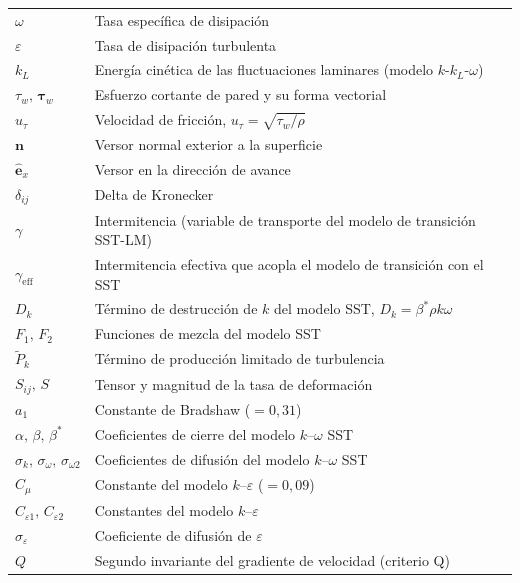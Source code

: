 \begin{longtable}{@{}p{} p{}@{}}
$\omega$    & Tasa específica de disipación \\
$\varepsilon$ & Tasa de disipación turbulenta \\
$k_L$       & Energía cinética de las fluctuaciones laminares (modelo $k$-$k_L$-$\omega$) \\
$\tau_w,\,\boldsymbol{\tau}_w$ & Esfuerzo cortante de pared y su forma vectorial \\
$u_\tau$    & Velocidad de fricción, $u_\tau=\sqrt{\tau_w/\rho}$ \\
$\mathbf{n}$ & Versor normal exterior a la superficie \\
$\hat{\mathbf{e}}_x$ & Versor en la dirección de avance \\
$\delta_{ij}$ & Delta de Kronecker \\
$\gamma$    & Intermitencia (variable de transporte del modelo de transición SST-LM) \\
$\gamma_{\mathrm{eff}}$ & Intermitencia efectiva que acopla el modelo de transición con el SST \\
$D_k$       & Término de destrucción de $k$ del modelo SST, $D_k=\beta^*\rho k\omega$ \\
$F_1,\,F_2$ & Funciones de mezcla del modelo SST \\
$\tilde{P}_k$ & Término de producción limitado de turbulencia \\
$S_{ij},\,S$& Tensor y magnitud de la tasa de deformación \\
$a_1$       & Constante de Bradshaw ($=0{,}31$) \\
$\alpha,\,\beta,\,\beta^*$ & Coeficientes de cierre del modelo $k$--$\omega$ SST \\
$\sigma_k,\,\sigma_\omega,\,\sigma_{\omega 2}$ & Coeficientes de difusión del modelo $k$--$\omega$ SST \\
$C_\mu$     & Constante del modelo $k$--$\varepsilon$ ($=0{,}09$) \\
$C_{\varepsilon 1},\,C_{\varepsilon 2}$ & Constantes del modelo $k$--$\varepsilon$ \\
$\sigma_\varepsilon$ & Coeficiente de difusión de $\varepsilon$ \\
$Q$         & Segundo invariante del gradiente de velocidad (criterio Q) \\
\end{longtable}

